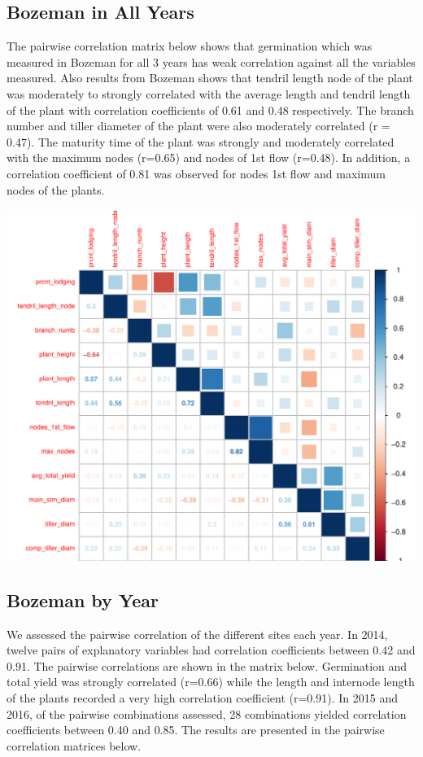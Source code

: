 \documentclass[11pt]{article}
\begin{document}
\subsection{Bozeman in All Years}
The pairwise correlation matrix below shows that germination which was measured in Bozeman for all 3 years has weak correlation against all the variables measured. Also results from Bozeman shows that tendril length node of the plant was moderately to strongly correlated with the average length and tendril length of the plant with correlation coefficients of 0.61 and 0.48 respectively. The branch number and tiller diameter of the plant were also moderately correlated (r = 0.47). The maturity time of the plant was strongly and moderately correlated with the maximum nodes (r=0.65) and nodes of 1st flow (r=0.48). In addition, a correlation coefficient of 0.81 was observed for nodes 1st flow and maximum nodes of the plants.
\label{"Figure 1: Correlation Plot of Bozeman (In All Years)"}
\begin{knitrout}\footnotesize
{}\color{fgcolor}

{\centering \includegraphics[width=\maxwidth]{figure/merged-1} 

}



\end{knitrout}




\subsection{Bozeman by Year}
We assessed the pairwise correlation of the different sites each year. In 2014, twelve pairs of explanatory variables had correlation coefficients between 0.42 and 0.91. The pairwise correlations are shown in the matrix below. Germination and total yield was strongly correlated (r=0.66) while the length and internode length of the plants recorded a very high correlation coefficient (r=0.91). In 2015 and 2016, of the pairwise combinations assessed, 28 combinations yielded correlation coefficients between 0.40 and 0.85. The results are presented in the pairwise correlation matrices below.
\end{document}
